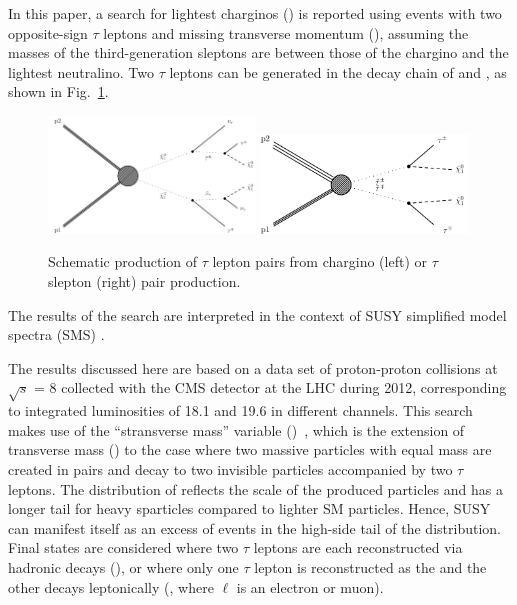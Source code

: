 In this paper, a search for lightest charginos (\chione) is reported using events 
with two opposite-sign $\tau$ leptons and 
missing transverse momentum (\MPT), assuming the masses of the third-generation sleptons are between those of the 
chargino and the lightest neutralino. 
Two $\tau$ leptons can be generated in the decay chain of \chione and \sTau, as shown in Fig.~\ref{fig:Productions}. 
\begin{figure}[!htb]
\centering
\includegraphics[width=0.49\textwidth]{Introductionfigs/TChipmSlepSnu.pdf}
\includegraphics[width=0.49\textwidth]{Introductionfigs/TSlepSlep.pdf}
\caption{Schematic production of $\tau$ lepton pairs from chargino (left) or $\tau$ slepton (right) pair production.}
\label{fig:Productions}
\end{figure}
The results of the search are interpreted in the context of SUSY simplified model spectra (SMS) \cite{Alwall:2008ag,alves:sms}.

The results discussed here are based on a data set of proton-proton 
collisions at $\sqrt{s}$ = 8\TeV
collected with the CMS detector at the LHC during 2012, corresponding to integrated
luminosities of 18.1 and 19.6 \invfb in different channels. 
This search makes use of the ``stransverse mass'' variable (\mttwo)~\cite{Lester:1999tx,Barr:2003rg},
which is the extension of transverse mass (\mt) to the case 
where two massive particles with equal mass are created in pairs  
and decay to two invisible particles accompanied by two $\tau$ leptons.  
The distribution of \mttwo reflects the scale of the produced particles and has a longer tail for heavy sparticles
compared to lighter SM particles. Hence, SUSY 
can manifest itself
as an excess of events in the high-side tail of the \mttwo distribution. 
Final states are considered where
two $\tau$ leptons are each reconstructed via hadronic decays (\tauTau), or where only one $\tau$ lepton is reconstructed as the \Tau and the other decays leptonically (\leptonTau, where $\ell$ is an electron or muon). 

